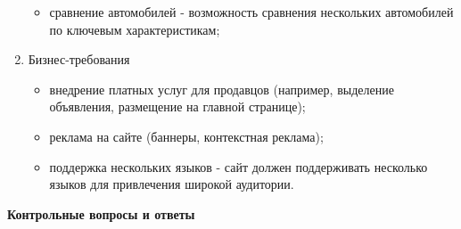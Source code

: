 \begin{enumerate}
\begin{itemize}
            \item сравнение автомобилей - возможность сравнения нескольких автомобилей по ключевым характеристикам;
        \end{itemize}
    \item Бизнес-требования
        \begin{itemize}
            \item внедрение платных услуг для продавцов (например, выделение объявления, размещение на главной странице);
            \item реклама на сайте (баннеры, контекстная реклама);
            \item поддержка нескольких языков - сайт должен поддерживать несколько языков для привлечения широкой аудитории.
        \end{itemize}
\end{enumerate}

\textbf{Контрольные вопросы и ответы}

